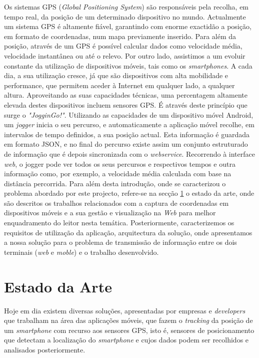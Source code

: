 \documentclass[twocolumn,twoside,10pt,a4paper]{article}
\begin{document}
Os sistemas GPS (\emph{Global Positioning System}) são responsáveis pela recolha, em tempo real, da posição de um determinado dispositivo no mundo. Actualmente um sistema GPS é altamente fiável, garantindo com enorme exactidão a posição, em formato de coordenadas, num mapa previamente inserido. Para além da posição, através de um GPS é possível calcular dados como velocidade média, velocidade instantânea ou até o relevo.
Por outro lado, assistimos a um evoluir constante da utilização de dispositivos móveis, tais como os \emph{smartphones}. A cada dia, a sua utilização cresce, já que são dispositivos com alta mobilidade e performance, que permitem aceder à Internet em qualquer lado, a qualquer altura. Aproveitando as suas capacidades técnicas, uma percentagem altamente elevada destes dispositivos incluem sensores GPS. 
É através deste princípio que surge o \textit{"JogginGo!"}. Utilizando as capacidades de um dispositivo móvel Android, um \emph{jogger} inicia o seu percurso, e automaticamente a aplicação móvel recolhe, em intervalos de tempo definidos, a sua posição actual. Esta informação é guardada em formato JSON, e no final do percurso existe assim um conjunto estruturado de informação que é depois sincronizada com o \emph{webservice}. Recorrendo à interface \textit{web}, o jogger pode ver todos os seus percursos e respectivos tempos e outra informação como, por exemplo, a velocidade média calculada com base na distância percorrida.
Para além desta introdução, onde se caracterizou o problema abordado
por este projecto, refere-se na secção \ref{sec:estarte} o
estado da arte, onde são descritos os trabalhos relacionados com a
captura de coordenadas em dispositivos móveis e a sua gestão e visualização na \textit{Web} para melhor enquadramento do leitor nesta temática.  Posteriormente, caracterizemos os requisitos de utilização da aplicação, arquitectura da solução, onde apresentamos a nossa solução para o problema de transmissão de informação entre os dois terminais (\textit{web} e \textit{moble}) e o trabalho desenvolvido.

\section{Estado da Arte}\label{sec:estarte}

Hoje em dia existem diversas soluções, apresentadas por empresas e \emph{developers} que trabalham na área das aplicações móveis, que fazem o \textit{tracking} da posição de um \emph{smartphone} com recurso aos sensores GPS, isto é, sensores de posicionamento que detectam a localização do \emph{smartphone} e cujos dados podem ser recolhidos e analisados posteriormente.
\end{document}
